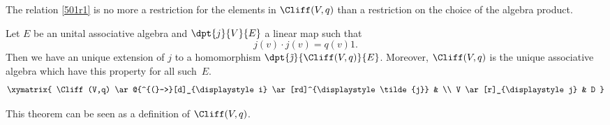 \begin{remark}
The relation \eqref{501r1} is no more a restriction for the elements in $\Cliff(V,q)$ than a restriction on the choice of the algebra product.
\end{remark}


\begin{theorem}
Let $E$ be an unital associative algebra and $\dpt{j}{V}{E}$ a linear map such that
\begin{equation}
    j(v)\cdot j(v)=q(v)1.        \label{102r1}
\end{equation}
Then we have an unique extension of $j$ to a homomorphism $\dpt{\tilde\jmath}{\Cliff(V,q)}{E}$. Moreover, $\Cliff(V,q)$ is the unique associative algebra which have this property for all such~$E$.
\[
\xymatrix{
    \Cliff(V,q) \ar@{^{(}->}[d]_{\displaystyle i} \ar[rd]^{\displaystyle\tilde{j}} &  \\
    V \ar[r]_{\displaystyle j} & D
  }
\]
\label{tho_Cliffunif}
\end{theorem}
This theorem can be seen as a definition of $\Cliff(V,q)$.

